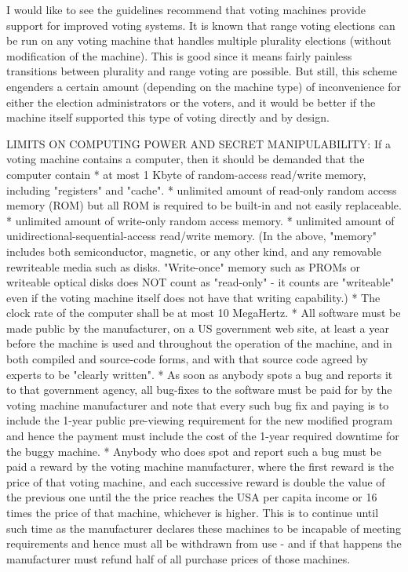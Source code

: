 I would like to see the guidelines recommend that voting machines provide support
for improved voting systems.  It is known that range voting elections can be run on
any voting machine that handles multiple plurality elections (without 
modification of the machine).  This is good since it means fairly painless transitions
between plurality and range voting are possible.  But still, this scheme engenders a
certain amount (depending on the machine type) of inconvenience
for either the election administrators or the voters, and it would be better if
the machine itself supported this type of voting directly and by design.

LIMITS ON COMPUTING POWER AND SECRET MANIPULABILITY:
If a voting machine contains a computer, then it should be demanded
that the computer contain 
   * at most 1 Kbyte of random-access read/write memory, including
   "registers" and "cache".
   * unlimited amount of read-only random access memory (ROM) but all
   ROM is required to be built-in and not easily replaceable.
   * unlimited amount of write-only random access memory.
   * unlimited amount of unidirectional-sequential-access read/write
   memory.
(In the above, "memory" includes both semiconductor, magnetic, or any
other kind, and any removable rewriteable media such as disks.  "Write-once"
memory such as PROMs or writeable optical disks does NOT count as "read-only" -
it counts are "writeable" even if the voting machine itself does not have that
writing capability.)
   * The clock rate of the computer shall be at most 10 MegaHertz.
   * All software must be made public by the manufacturer,
    on a US government web site, at least a year before the machine is
    used and throughout the operation of the machine, and in
    both compiled and source-code forms, and with that source code
    agreed by experts to be "clearly written".
   * As soon as anybody spots a bug and reports it to that government
   agency, all bug-fixes to the software must be paid for by the voting machine 
   manufacturer and note that every such bug fix and paying is to include
   the 1-year public pre-viewing requirement for the new modified program
   and hence the payment must include the cost of the 1-year required
   downtime for the buggy machine.
    * Anybody who does spot and report such a bug must be paid a reward
by the voting machine manufacturer, where the first reward is the price
of that voting machine, and each successive reward is double the value of the
previous one until the the price reaches the USA per capita income or 16 times
the price of that machine, whichever is higher.
This is to continue until such time as the manufacturer declares these
machines to be incapable of meeting requirements and hence must all be
withdrawn from use - and if that happens the manufacturer must refund half of
all purchase prices of those machines.

